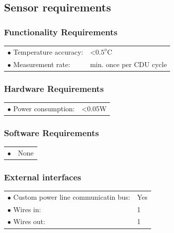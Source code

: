 \subsection{Sensor requirements}

\subsubsection{Functionality Requirements}
\begin{table}[H]
\begin{tabular}{p{8cm} p{5cm}}
$\bullet$ Temperature accuracy: & <$0.5^o$C\\
$\bullet$ Measurement rate: & min. once per CDU cycle\\
\end{tabular}
\end{table}

\subsubsection{Hardware Requirements}
\begin{table}[H]
\begin{tabular}{p{8cm} p{2cm}}
$\bullet$ Power consumption: & <0.05W\\


\end{tabular}
\end{table}


\subsubsection{Software Requirements}
\begin{table}[H]
\begin{tabular}{p{8cm} p{2cm}}
$\bullet$ & None\\


\end{tabular}
\end{table}


\subsubsection{External interfaces}
\begin{table}[H]
\begin{tabular}{p{8cm} p{2cm}}
$\bullet$ Custom power line communicatin bus: & Yes\\
$\bullet$ Wires in: & 1\\
$\bullet$ Wires out: & 1\\
\end{tabular}
\end{table}

